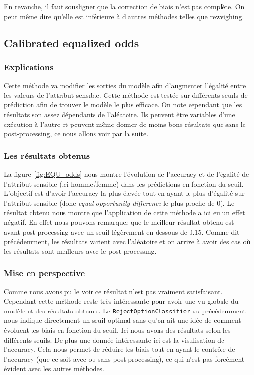 \documentclass{article}
\begin{document}
    En revanche, il faut sousligner que la correction de biais n'est pas complète. On peut même dire qu'elle est inférieure à d'autres méthodes telles que reweighing.
    
    \subsection{Calibrated equalized odds}
    \subsubsection{Explications}
    Cette méthode va modifier les sorties du modèle afin d'augmenter l'égalité entre les valeurs de l'attribut 
    sensible. Cette méthode est testée sur différents seuils de prédiction afin de trouver le modèle le plus efficace.
    On note cependant que les résultats son assez dépendants de l'aléatoire. Ils 
    peuvent être variables d'une exécution à l'autre et peuvent même donner de moins bons résultats que sans le 
    post-processing, ce nous allons voir par la suite.

    \subsubsection{Les résultats obtenus}
    La figure~\ref{fig:EQU_odds} nous montre l'évolution de l'accuracy et de l'égalité de l'attribut sensible 
    (ici homme/femme) dans les prédictions en fonction du seuil. L'objectif est d'avoir l'accuracy la plus élevée tout 
    en ayant le plus d'égalité sur l'attribut sensible (donc \textit{equal opportunity difference} le plus proche de 0).
    Le résultat obtenu nous montre que l'application de cette méthode a ici eu un effet négatif. En effet nous pouvons 
    remarquer que le meilleur résultat obtenu est avant post-processing avec un seuil légèrement en dessous de $0.15$.
    Comme dit précédemment, les résultats varient avec l'aléatoire et on arrive à avoir des cas où les résultats sont 
    meilleurs avec le post-processing.

    

    \subsubsection{Mise en perspective}
    Comme nous avons pu le voir ce résultat n'est pas vraiment satisfaisant. Cependant cette méthode reste très
    intéressante pour avoir une vu globale du modèle et des résultats obtenus.
    Le \texttt{RejectOptionClassifier} vu précédemment nous indique directement un seuil optimal sans qu'on ait 
    une idée de comment évoluent les biais en fonction du seuil. Ici nous avons des résultats selon les 
    différents seuils. De plus une donnée intéressante ici est la visulisation de l'accuracy. Cela 
    nous permet de réduire les biais tout en ayant le contrôle de l'accuracy (que ce soit avec ou sans 
    post-processing), ce qui n'est pas forcément évident avec les autres méthodes.
    
\end{document}
